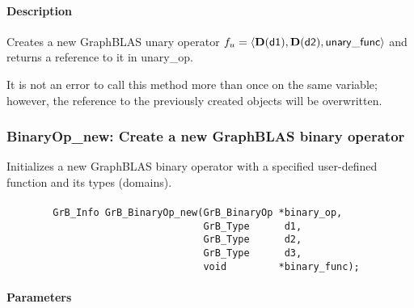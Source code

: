 \paragraph{Description}

Creates a new GraphBLAS unary operator $f_u = \langle \bold{D}({\sf d1}), 
\bold{D}({\sf d2}), {\sf unary\_func} \rangle$ and returns a reference to it 
in {\sf unary\_op}.

It is not an error to call this method more than once on the same variable;  
however, the reference to the previously created objects will be overwritten. 


\subsubsection{{\sf BinaryOp\_new}: Create a new GraphBLAS binary operator}

Initializes a new GraphBLAS binary operator with a specified user-defined 
function and its types (domains).

\paragraph{\syntax}

\begin{verbatim}
        GrB_Info GrB_BinaryOp_new(GrB_BinaryOp *binary_op,
                                  GrB_Type      d1,
                                  GrB_Type      d2,
                                  GrB_Type      d3,
                                  void         *binary_func);
\end{verbatim}

\paragraph{Parameters}


